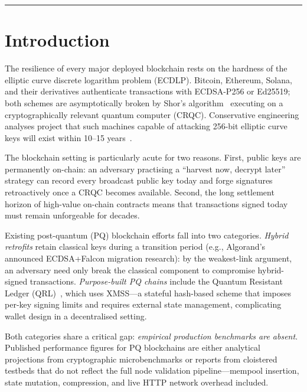 \documentclass[11pt,a4paper]{article}
\begin{document}
\hrule
\vspace{1em}


\section{Introduction}
\label{sec:intro}
The resilience of every major deployed blockchain rests on the hardness of the
elliptic curve discrete logarithm problem (ECDLP). Bitcoin, Ethereum, Solana,
and their derivatives authenticate transactions with ECDSA-P256 or Ed25519;
both schemes are asymptotically broken by Shor's algorithm~\cite{shor1994}
executing on a cryptographically relevant quantum computer (CRQC). Conservative
engineering analyses project that such machines capable of attacking 256-bit
elliptic curve keys will exist within 10--15 years~\cite{mosca2018,aggarwal2018}.

The blockchain setting is particularly acute for two reasons. First, public keys
are permanently on-chain: an adversary practising a ``harvest now, decrypt later''
strategy can record every broadcast public key today and forge signatures
retroactively once a CRQC becomes available. Second, the long settlement
horizon of high-value on-chain contracts means that transactions signed today
must remain unforgeable for decades.

Existing post-quantum (PQ) blockchain efforts fall into two categories.
\emph{Hybrid retrofits} retain classical keys during a transition period
(e.g., Algorand's announced ECDSA+Falcon migration research): by the
weakest-link argument, an adversary need only break the classical component
to compromise hybrid-signed transactions. \emph{Purpose-built PQ chains} include
the Quantum Resistant Ledger (QRL)~\cite{hulsing2018}, which uses XMSS---a
stateful hash-based scheme that imposes per-key signing limits and requires
external state management, complicating wallet design in a decentralised setting.

Both categories share a critical gap: \emph{empirical production benchmarks
are absent}. Published performance figures for PQ blockchains are either
analytical projections from cryptographic microbenchmarks or reports from
cloistered testbeds that do not reflect the full node validation
pipeline---mempool insertion, state mutation, compression, and live HTTP
network overhead included.
\end{document}

